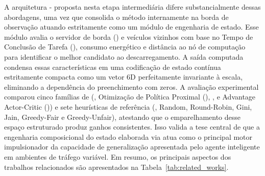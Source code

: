 A arquitetura - proposta nesta etapa intermediária difere substancialmente dessas abordagens, uma vez que consolida o método  internamente na borda de observação atuando estritamente como um módulo de engenharia de estado. Esse módulo avalia o servidor de borda () e veículos vizinhos com base no Tempo de Conclusão de Tarefa (), consumo energético e distância ao nó de computação para identificar o melhor candidato ao descarregamento. A saída computada condensa essas características em uma codificação de estado contínua estritamente compacta como um vetor 6D perfeitamente invariante à escala, eliminando a dependência do preenchimento com zeros. A avaliação experimental comparou cinco famílias de  (, Otimização de Política Proximal (), ,  e Advantage Actor-Critic ()) e sete heurísticas de referência (, Random, Round-Robin, Gini, Jain, Greedy-Fair e Greedy-Unfair), atestando que o emparelhamento desse espaço estruturado produz ganhos consistentes. Isso valida a tese central de que a engenharia composicional do estado elaborada via  atua como o principal motor impulsionador da capacidade de generalização apresentada pelo agente inteligente em ambientes de tráfego variável. Em resumo, os principais aspectos dos trabalhos relacionados são apresentados na Tabela~\ref{tab:related_works}.

